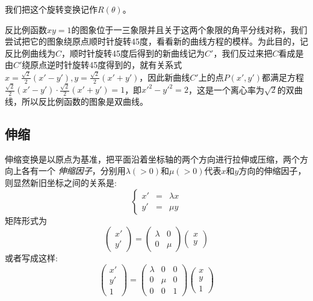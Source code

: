 我们把这个旋转变换记作$R(\theta)$。

\begin{example}
  反比例函数$xy=1$的图象位于一三象限并且关于这两个象限的角平分线对称，我们尝试把它的图象绕原点顺时针旋转45度，看看新的曲线方程的模样。为此目的，记反比例曲线为$C$，顺时针旋转45度后得到的新曲线记为$C'$，我们反过来把$C$看成是由$C'$绕原点逆时针旋转45度得到的，就有关系式$x=\frac{\sqrt{2}}{2}(x'-y'), y=\frac{\sqrt{2}}{2}(x'+y')$，因此新曲线$C'$上的点$P(x',y')$都满足方程$\frac{\sqrt{2}}{2}(x'-y') \cdot \frac{\sqrt{2}}{2}(x'+y')=1$，即$x'^2-y'^2=2$，这是一个离心率为$\sqrt{2}$的双曲线，所以反比例函数的图象是双曲线。
\end{example}

\subsection{伸缩}

伸缩变换是以原点为基准，把平面沿着坐标轴的两个方向进行拉伸或压缩，两个方向上各有一个 \emph{伸缩因子}，分别用$\lambda(>0)$和$\mu(>0)$代表$x$和$y$方向的伸缩因子，则显然新旧坐标之间的关系是:
\begin{equation}
  \label{eq:scale-translation-coordinate-formula}
  \left\{
    \begin{array}{ccc}
      x' & = & \lambda x \\
      y' & = & \mu y
    \end{array}
  \right.
\end{equation}
矩阵形式为
\begin{equation*}
  \left(
    \begin{array}{c}
      x' \\
      y'
    \end{array}
  \right)
    =
    \left(
      \begin{array}{cc}
        \lambda & 0 \\
        0 & \mu
      \end{array}
    \right)
  \left(
    \begin{array}{c}
      x \\
      y
    \end{array}
  \right)
\end{equation*}
或者写成这样:
\begin{equation*}
  \label{eq:scale-translation-coordinate-formula-matrix}
  \left(
    \begin{array}{c}
      x' \\
      y' \\
      1
    \end{array}
  \right)
    =
    \left(
      \begin{array}{ccc}
        \lambda & 0 & 0 \\
        0 & \mu & 0 \\
        0 & 0 & 1
      \end{array}
    \right)
  \left(
    \begin{array}{c}
      x \\
      y \\
      1
    \end{array}
  \right)
\end{equation*}

